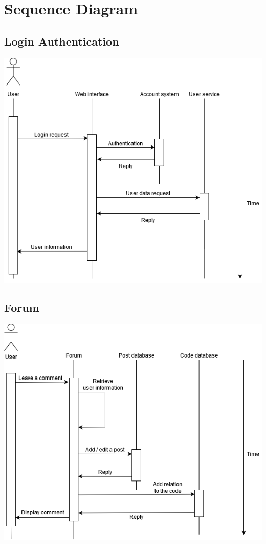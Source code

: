 \section{Sequence Diagram}
    \subsection{Login Authentication}
    \includegraphics[scale=0.5]{Doc/Graphics/seq_diagram_login}
    \subsection{Forum}
    \includegraphics[scale=0.5]{Doc/Graphics/seq_diagram_forum}

